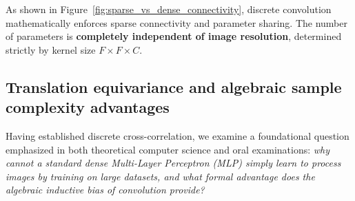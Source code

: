 As shown in Figure~\ref{fig:sparse_vs_dense_connectivity}, discrete convolution mathematically enforces sparse connectivity and parameter sharing. The number of parameters is \textbf{completely independent of image resolution}, determined strictly by kernel size $F \times F \times C$.

\subsection{Translation equivariance and algebraic sample complexity advantages}
\label{sec:translation_equivariance_sample_complexity}

Having established discrete cross-correlation, we examine a foundational question emphasized in both theoretical computer science and oral examinations: \textit{why cannot a standard dense Multi-Layer Perceptron (MLP) simply learn to process images by training on large datasets, and what formal advantage does the algebraic inductive bias of convolution provide?}~\cite{prince2023understanding,goodfellow2016deep}

